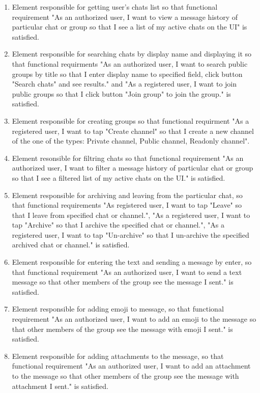 \begin{enumerate}
    \item Element responsible for getting user's chats list so that functional requirement "As an authorized user,
    I want to view a message history of particular chat or group so that I see a list of my active chats on the UI" is satisfied.
    \item Element responsible for searching chats by display name and displaying it so that functional requirments
    "As an authorized user, I want to search public groups by title so that I enter display name to specified field,
    click button "Search chats" and see results." and "As a registered user, I want to join public groups so that I click button "Join group"
    to join the group." is satisfied.
    \item Element responsible for creating groups so that functional requirment "As a registered user, I want to tap "Create channel"
    so that I create a new channel of the one of the types: Private channel, Public channel, Readonly channel".
    \item Element resonsible for filtring chats so that functional requirement "As an authorized user,
    I want to filter a message history of particular chat or group so that I see a filtered list of my active chats on the UI." is satisfied.
    \item Element responsible for archiving and leaving from the particular chat, so that functional requirements "As registered user, I want to tap
    "Leave" so that I leave from specified chat or channel.", "As a registered user, I want to tap "Archive" so that I archive the specified chat
    or channel.", "As a registered user, I want to tap "Un-archive" so that I un-archive the specified
    archived chat or channel." is satisfied.
    \item Element responsible for entering the text and sending a message by enter, so that functional requirement "As an authorized user,
    I want to send a text message so that other members of the group see the message I sent." is satisfied.
    \item Element responsible for adding emoji to message, so that functional requirement "As an authorized user, I want to add an emoji
    to the message so that other members of the group see the message with emoji I sent." is satisfied.
    \item Element responsible for adding attachments to the message, so that functional requirement "As an authorized user,
    I want to add an attachment to the message so that other members of the group see the message with attachment I sent." is satisfied.

\end{enumerate}
